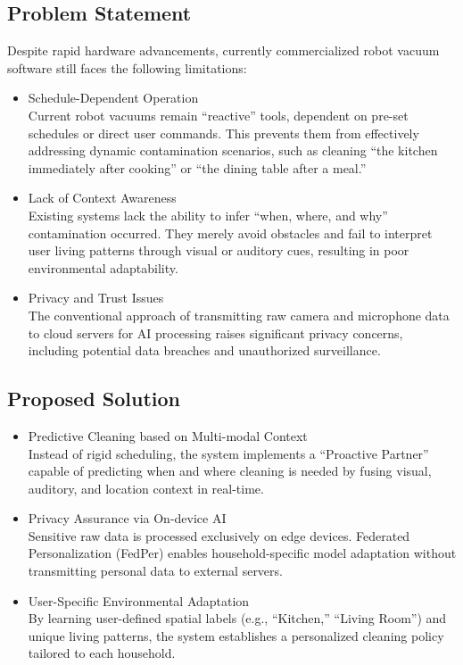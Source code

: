 \documentclass[conference]{IEEEtran}
\begin{document}
\subsection{Problem Statement}
Despite rapid hardware advancements, currently commercialized robot vacuum software still faces the following limitations:
\begin{itemize}
    \item [1)] Schedule-Dependent Operation \\
    Current robot vacuums remain ``reactive'' tools, dependent on pre-set schedules or direct user commands. This prevents them from effectively addressing dynamic contamination scenarios, such as cleaning ``the kitchen immediately after cooking'' or ``the dining table after a meal.''

    \item [2)] Lack of Context Awareness \\
    Existing systems lack the ability to infer ``when, where, and why'' contamination occurred. They merely avoid obstacles and fail to interpret user living patterns through visual or auditory cues, resulting in poor environmental adaptability.

    \item [3)] Privacy and Trust Issues \\
    The conventional approach of transmitting raw camera and microphone data to cloud servers for AI processing raises significant privacy concerns, including potential data breaches and unauthorized surveillance.
\end{itemize} 


\subsection{Proposed Solution}
\begin{itemize}
    \item [1)] Predictive Cleaning based on Multi-modal Context \\
    Instead of rigid scheduling, the system implements a ``Proactive Partner'' capable of predicting when and where cleaning is needed by fusing visual, auditory, and location context in real-time.

    \item [2)] Privacy Assurance via On-device AI \\
    Sensitive raw data is processed exclusively on edge devices. Federated Personalization (FedPer) enables household-specific model adaptation without transmitting personal data to external servers.

    \item [3)] User-Specific Environmental Adaptation \\
    By learning user-defined spatial labels (e.g., ``Kitchen,'' ``Living Room'') and unique living patterns, the system establishes a personalized cleaning policy tailored to each household.
\end{itemize}
\end{document}
